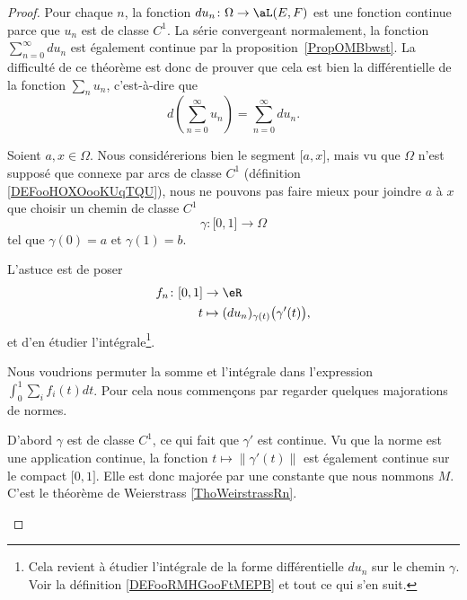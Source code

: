 \begin{proof}
	Pour chaque \( n\), la fonction \( du_n\colon \Omega\to \aL(E,F)\) est une fonction continue parce que \( u_n\) est de classe \( C^1\). La série convergeant normalement, la fonction \( \sum_{n=0}^{\infty}du_n\) est également continue par la proposition~\ref{PropOMBbwst}. La difficulté de ce théorème est donc de prouver que cela est bien la différentielle de la fonction \( \sum_nu_n\), c'est-à-dire que
	\begin{equation}
		d\left( \sum_{n=0}^{\infty}u_n \right)=\sum_{n=0}^{\infty}du_n.
	\end{equation}

	Soient \( a,x\in \Omega\). Nous considérerions bien le segment \( \mathopen[ a , x \mathclose]\), mais vu que \( \Omega\) n'est supposé que connexe par arcs de classe \( C^1\) (définition \ref{DEFooHOXOooKUqTQU}), nous ne pouvons pas faire mieux pour joindre \( a\) à \( x\) que choisir un chemin de classe \( C^1\)
	\begin{equation}
		\gamma\colon \mathopen[ 0 , 1 \mathclose]\to \Omega
	\end{equation}
	tel que \( \gamma(0)=a\) et \( \gamma(1)=b\).

	L'astuce est de poser
	\begin{equation}
		\begin{aligned}
			f_n\colon \mathopen[ 0 , 1 \mathclose] & \to \eR                                           \\
			t                                      & \mapsto (du_n)_{\gamma(t)}\big( \gamma'(t) \big),
		\end{aligned}
	\end{equation}
	et d'en étudier l'intégrale\footnote{Cela revient à étudier l'intégrale de la forme différentielle \( du_n\) sur le chemin \( \gamma\). Voir la définition \ref{DEFooRMHGooFtMEPB} et tout ce qui s'en suit.}.

	\begin{subproof}
		Nous voudrions permuter la somme et l'intégrale dans l'expression \( \int_0^1\sum_if_i(t)dt\). Pour cela nous commençons par regarder quelques majorations de normes.

		D'abord \( \gamma\) est de classe \( C^1\), ce qui fait que \( \gamma'\) est continue. Vu que la norme est une application continue, la fonction \( t\mapsto \| \gamma'(t) \|\) est également continue sur le compact \( \mathopen[ 0 , 1 \mathclose]\). Elle est donc majorée par une constante que nous nommons \( M\). C'est le théorème de Weierstrass \ref{ThoWeirstrassRn}.


\end{subproof}
\end{proof}
